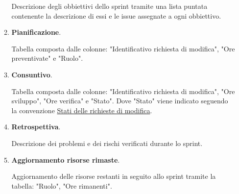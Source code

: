 \begin{enumerate}
\begin{enumerate}
        Descrizione degli obbiettivi dello sprint tramite una lista puntata contenente la descrizione di essi e le issue assegnate a ogni obbiettivo.
        \item \textbf{Pianificazione}.
        
        Tabella composta dalle colonne: "Identificativo richiesta di modifica", "Ore preventivate" e "Ruolo".

        \item \textbf{Consuntivo}.
        
        Tabella composta dalle colonne: "Identificativo richiesta di modifica", "Ore sviluppo", "Ore verifica" e "Stato".
        Dove "Stato" viene indicato seguendo la convenzione \hyperref[par:stati]{Stati delle richieste di modifica}.
        
        \item \textbf{Retrospettiva}.
        
        Descrizione dei problemi e dei rischi verificati durante lo sprint.

        \item \textbf{Aggiornamento risorse rimaste}.
        
        Aggiornamento delle risorse restanti in seguito allo sprint tramite la tabella:
        "Ruolo", "Ore rimanenti".
        
    \end{enumerate}

\end{enumerate}